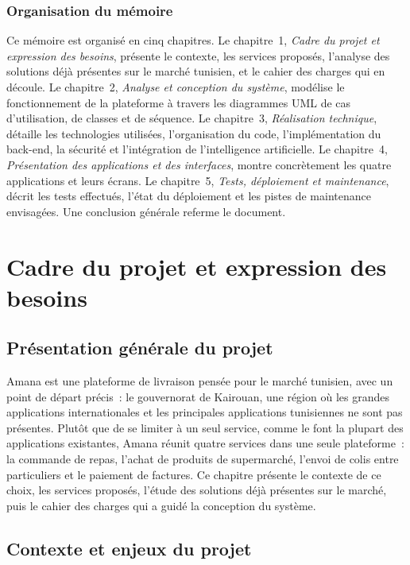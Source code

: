 \documentclass[12pt,fleqn,a4paper]{report}
\begin{document}
\begin{justify}
\subsection*{Organisation du mémoire}

Ce mémoire est organisé en cinq chapitres. Le chapitre~1, \textit{Cadre du projet et expression des besoins}, présente le contexte, les services proposés, l'analyse des solutions déjà présentes sur le marché tunisien, et le cahier des charges qui en découle. Le chapitre~2, \textit{Analyse et conception du système}, modélise le fonctionnement de la plateforme à travers les diagrammes UML de cas d'utilisation, de classes et de séquence. Le chapitre~3, \textit{Réalisation technique}, détaille les technologies utilisées, l'organisation du code, l'implémentation du back-end, la sécurité et l'intégration de l'intelligence artificielle. Le chapitre~4, \textit{Présentation des applications et des interfaces}, montre concrètement les quatre applications et leurs écrans. Le chapitre~5, \textit{Tests, déploiement et maintenance}, décrit les tests effectués, l'état du déploiement et les pistes de maintenance envisagées. Une conclusion générale referme le document.

\chapter{Cadre du projet et expression des besoins}

\section{Présentation générale du projet}

Amana est une plateforme de livraison pensée pour le marché tunisien, avec un point de départ précis~: le gouvernorat de Kairouan, une région où les grandes applications internationales et les principales applications tunisiennes ne sont pas présentes. Plutôt que de se limiter à un seul service, comme le font la plupart des applications existantes, Amana réunit quatre services dans une seule plateforme~: la commande de repas, l'achat de produits de supermarché, l'envoi de colis entre particuliers et le paiement de factures. Ce chapitre présente le contexte de ce choix, les services proposés, l'étude des solutions déjà présentes sur le marché, puis le cahier des charges qui a guidé la conception du système.

\section{Contexte et enjeux du projet}


\end{justify}
\end{document}
